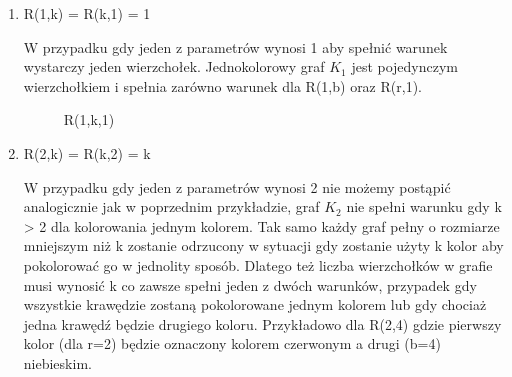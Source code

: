 \begin{enumerate}  

  \item R(1,k) = R(k,1) = 1 \hfill \par
  W przypadku gdy jeden z parametrów wynosi 1 aby spełnić warunek wystarczy jeden wierzchołek.  Jednokolorowy graf $\mathit{K}_{1}$ jest pojedynczym wierzchołkiem i spełnia zarówno warunek dla R(1,b) oraz R(r,1). 
  
  \begin{figure}[h]
  \centering
   \caption{R(1,k,1)}
\end{figure}
  
   \item R(2,k) = R(k,2) = k \hfill \par
	W przypadku gdy jeden z parametrów wynosi 2 nie możemy postąpić analogicznie jak w poprzednim przykładzie, graf $\mathit{K}_{2}$ nie spełni warunku gdy k > 2 dla kolorowania jednym kolorem. Tak samo każdy graf pełny o rozmiarze mniejszym niż k zostanie odrzucony w sytuacji gdy zostanie użyty k kolor aby pokolorować go w jednolity sposób. Dlatego też liczba wierzchołków w grafie musi wynosić k co zawsze spełni jeden z dwóch warunków, przypadek gdy wszystkie krawędzie zostaną pokolorowane jednym kolorem lub gdy chociaż jedna krawędź będzie drugiego koloru. Przykładowo dla R(2,4) gdzie pierwszy kolor (dla r=2) będzie oznaczony kolorem czerwonym a drugi (b=4) niebieskim.
	
\begin{figure}[H]
  \centering
        \hspace{15mm}
\end{figure}
\end{enumerate}
